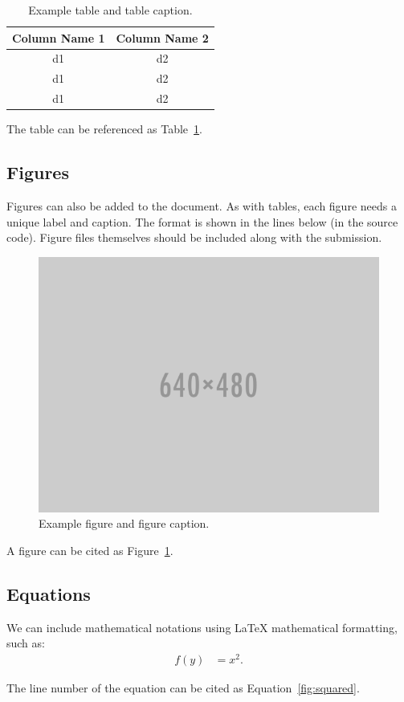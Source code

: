 \documentclass{anthology-ch}         %
\begin{document}
\begin{table}[h]
  \centering 
  \begin{tabular}{cc}
    \toprule
    Column Name 1 & Column Name 2\\
    \midrule
    d1 & d2 \\
    d1 & d2 \\
    d1 & d2 \\
    \bottomrule
  \end{tabular}
  \caption{Example table and table caption.}
  \label{tab:example}
\end{table}

The table can be referenced as Table~\ref{tab:example}.

\subsection{Figures}

Figures can also be added to the document. As with tables, each figure needs
a unique label and caption. The format is shown in the lines below
(in the source code). Figure files themselves should be included along with the
submission.

\begin{figure}[t!]
  \centering
  \includegraphics[width=0.4\linewidth]{640x480.png}
  \caption{Example figure and figure caption.}
  \label{fig:example}
\end{figure}

A figure can be cited as Figure~\ref{fig:example}.

\subsection{Equations}

We can include mathematical notations using LaTeX mathematical formatting,
such as:
\begin{align}
f(y) &= x^2. \label{fig:squared}
\end{align}

The line number of the equation can be cited as Equation~\ref{fig:squared}.
\end{document}
